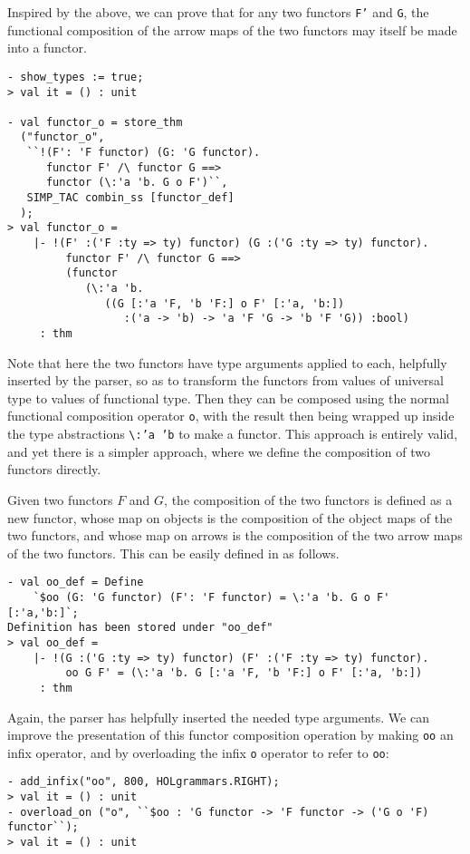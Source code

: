 Inspired by the above, we can prove that for any two functors \texttt{F'} and \texttt{G},
the functional composition of the arrow maps of the two functors may itself be made into
a functor.
%
\begin{session}
\begin{verbatim}
- show_types := true;
> val it = () : unit

- val functor_o = store_thm
  ("functor_o",
   ``!(F': 'F functor) (G: 'G functor).
      functor F' /\ functor G ==>
      functor (\:'a 'b. G o F')``,
   SIMP_TAC combin_ss [functor_def]
  );
> val functor_o =
    |- !(F' :('F :ty => ty) functor) (G :('G :ty => ty) functor).
         functor F' /\ functor G ==>
         (functor
            (\:'a 'b.
               ((G [:'a 'F, 'b 'F:] o F' [:'a, 'b:])
                  :('a -> 'b) -> 'a 'F 'G -> 'b 'F 'G)) :bool)
     : thm
\end{verbatim}
\end{session}
Note that here the two functors have type arguments applied to each, helpfully
inserted by the parser, so as to transform the functors from values of 
universal type to values of functional type. Then they can be composed using 
the normal functional composition operator \texttt{o}, with the result then 
being wrapped up inside the type abstractions \verb|\|\texttt{:'a~'b}
to make a functor.  This approach is entirely valid, and yet there is 
a simpler approach, where we define the composition of two functors directly.

Given two functors $F$ and $G$, the composition of the two functors is
defined as a new functor, whose map on objects is the composition of the object maps
of the two functors, and whose map on arrows is the composition of the two arrow maps
of the two functors.  This can be easily defined in \HOLW as follows.
%
\begin{session}
\begin{verbatim}
- val oo_def = Define
    `$oo (G: 'G functor) (F': 'F functor) = \:'a 'b. G o F' [:'a,'b:]`;
Definition has been stored under "oo_def"
> val oo_def =
    |- !(G :('G :ty => ty) functor) (F' :('F :ty => ty) functor).
         oo G F' = (\:'a 'b. G [:'a 'F, 'b 'F:] o F' [:'a, 'b:])
     : thm
\end{verbatim}
\end{session}

Again, the parser has helpfully inserted the needed type arguments.
We can improve the presentation of this functor composition
operation by making \texttt{oo} an infix operator, and by overloading the infix
\texttt{o} operator to refer to \texttt{oo}:
%
\begin{session}
\begin{verbatim}
- add_infix("oo", 800, HOLgrammars.RIGHT);
> val it = () : unit
- overload_on ("o", ``$oo : 'G functor -> 'F functor -> ('G o 'F) functor``);
> val it = () : unit
\end{verbatim}
\end{session}

